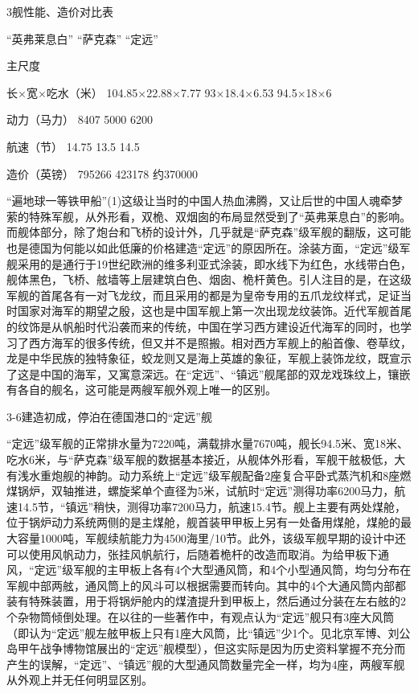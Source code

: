 \documentclass[12pt,UTF8]{ctexbook}
\begin{document}
3舰性能、造价对比表

“英弗莱息白” “萨克森” “定远”

主尺度

长×宽×吃水（米） 104.85×22.88×7.77 93×18.4×6.53 94.5×18×6

动力（马力） 8407 5000 6200

航速（节） 14.75 13.5 14.5

造价（英镑） 795266 423178 约370000

“遍地球一等铁甲船”(1)这级让当时的中国人热血沸腾，又让后世的中国人魂牵梦萦的特殊军舰，从外形看，双桅、双烟囱的布局显然受到了“英弗莱息白”的影响。而舰体部分，除了炮台和飞桥的设计外，几乎就是“萨克森”级军舰的翻版，这可能也是德国为何能以如此低廉的价格建造“定远”的原因所在。涂装方面，“定远”级军舰采用的是通行于19世纪欧洲的维多利亚式涂装，即水线下为红色，水线带白色，舰体黑色，飞桥、舷墙等上层建筑白色、烟囱、桅杆黄色。引人注目的是，在这级军舰的首尾各有一对飞龙纹，而且采用的都是为皇帝专用的五爪龙纹样式，足证当时国家对海军的期望之殷，这也是中国军舰上第一次出现龙纹装饰。近代军舰首尾的纹饰是从帆船时代沿袭而来的传统，中国在学习西方建设近代海军的同时，也学习了西方海军的很多传统，但又并不是照搬。相对西方军舰上的船首像、卷草纹，龙是中华民族的独特象征，蛟龙则又是海上英雄的象征，军舰上装饰龙纹，既宣示了这是中国的海军，又寓意深远。在“定远”、“镇远”舰尾部的双龙戏珠纹上，镶嵌有各自的舰名，这可能是两艘军舰外观上唯一的区别。

3-6建造初成，停泊在德国港口的“定远”舰

“定远”级军舰的正常排水量为7220吨，满载排水量7670吨，舰长94.5米、宽18米、吃水6米，与“萨克森”级军舰的数据基本接近，从舰体外形看，军舰干舷极低，大有浅水重炮舰的神韵。动力系统上“定远”级军舰配备2座复合平卧式蒸汽机和8座燃煤锅炉，双轴推进，螺旋桨单个直径为5米，试航时“定远”测得功率6200马力，航速14.5节，“镇远”稍快，测得功率7200马力，航速15.4节。舰上主要有两处煤舱，位于锅炉动力系统两侧的是主煤舱，舰首装甲甲板上另有一处备用煤舱，煤舱的最大容量1000吨，军舰续航能力为4500海里/10节。此外，该级军舰早期的设计中还可以使用风帆动力，张挂风帆航行，后随着桅杆的改造而取消。为给甲板下通风，“定远”级军舰的主甲板上各有4个大型通风筒，和4个小型通风筒，均匀分布在军舰中部两舷，通风筒上的风斗可以根据需要而转向。其中的4个大通风筒内部都装有特殊装置，用于将锅炉舱内的煤渣提升到甲板上，然后通过分装在左右舷的2个杂物筒倾倒处理。在以往的一些著作中，有观点认为“定远”舰只有3座大风筒（即认为“定远”舰左舷甲板上只有1座大风筒，比“镇远”少1个。见北京军博、刘公岛甲午战争博物馆展出的“定远”舰模型），但这实际是因为历史资料掌握不充分而产生的误解，“定远”、“镇远”舰的大型通风筒数量完全一样，均为4座，两艘军舰从外观上并无任何明显区别。
\end{document}

